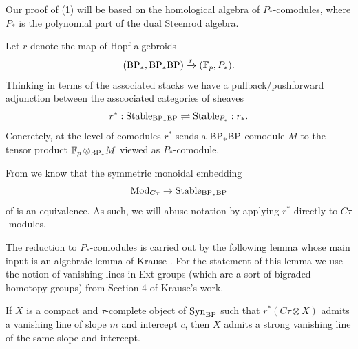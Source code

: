 

Our proof of (1) will be based on the homological algebra of $P_*$-comodules, where $P_*$ is the polynomial part of the dual Steenrod algebra.

\begin{rec}
  Let $r$ denote the map of Hopf algebroids
  \[ (\mathrm{BP}_*, \mathrm{BP}_*\mathrm{BP}) \xrightarrow{r} (\operatorname{\mathbb{F}}_p, P_*). \]
  Thinking in terms of the associated stacks we have a pullback/pushforward adjunction between the asscociated categories of sheaves
  \[ r^* : \mathrm{Stable}_{\mathrm{BP}_* \mathrm{BP}} \rightleftharpoons \mathrm{Stable}_{P_*} : r_*. \]
  Concretely, at the level of comodules $r^*$ sends a $\mathrm{BP}_*\mathrm{BP}$-comodule $M$ to the tensor product $\operatorname{\mathbb{F}}_p \otimes_{\mathrm{BP}_*} M$ viewed as $P_*$-comodule.
\end{rec}

From \cite[Proposition 4.53]{Pstragowski} we know that the symmetric monoidal embedding \[\mathrm{Mod}_{C\tau} \to \mathrm{Stable}_{\mathrm{BP}_* \mathrm{BP}}\]
of  is an equivalence.
As such, we will abuse notation by applying $r^*$ directly to $C\tau$-modules.

The reduction to $P_*$-comodules is carried out by the following lemma whose main input is an algebraic lemma of Krause \cite[Proposition 4.22]{AchimThesis}. For the statement of this lemma we use the notion of vanishing lines in Ext groups (which are a sort of bigraded homotopy groups) from Section 4 of Krause's work.

\begin{lem} \label{lemm:reduce-to-P}
  If $X$ is a compact and $\tau$-complete object of $\mathrm{Syn}_{\mathrm{BP}}$ such that
  $r^*(C\tau \otimes X)$ admits a vanishing line of slope $m$ and intercept $c$,
  then $X$ admits a strong vanishing line of the same slope and intercept.
\end{lem}

